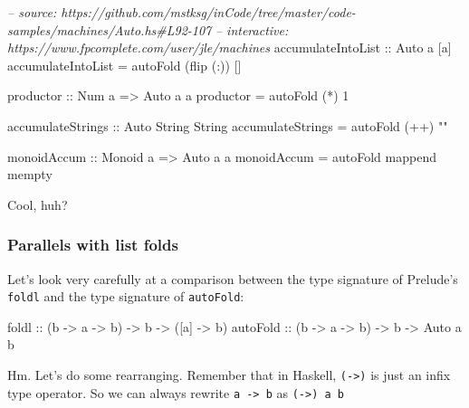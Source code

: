 \documentclass[]{article}
\newenvironment{Shaded}{\begin{snugshade}}{\end{snugshade}}
\newcommand{\CommentTok}[1]{\textcolor[rgb]{0.56,0.35,0.01}{\textit{#1}}}
\newcommand{\DataTypeTok}[1]{\textcolor[rgb]{0.13,0.29,0.53}{#1}}
\newcommand{\DecValTok}[1]{\textcolor[rgb]{0.00,0.00,0.81}{#1}}
\newcommand{\FunctionTok}[1]{\textcolor[rgb]{0.00,0.00,0.00}{#1}}
\newcommand{\NormalTok}[1]{#1}
\newcommand{\OtherTok}[1]{\textcolor[rgb]{0.56,0.35,0.01}{#1}}
\newcommand{\StringTok}[1]{\textcolor[rgb]{0.31,0.60,0.02}{#1}}
\begin{document}
\begin{Shaded}
\begin{Highlighting}[]
\CommentTok{-- source: https://github.com/mstksg/inCode/tree/master/code-samples/machines/Auto.hs#L92-107}
\CommentTok{-- interactive: https://www.fpcomplete.com/user/jle/machines}
\OtherTok{accumulateIntoList ::} \DataTypeTok{Auto}\NormalTok{ a [a]}
\NormalTok{accumulateIntoList }\FunctionTok{=}\NormalTok{ autoFold (flip (}\FunctionTok{:}\NormalTok{)) []}

\OtherTok{productor ::} \DataTypeTok{Num}\NormalTok{ a }\OtherTok{=>} \DataTypeTok{Auto}\NormalTok{ a a}
\NormalTok{productor }\FunctionTok{=}\NormalTok{ autoFold (}\FunctionTok{*}\NormalTok{) }\DecValTok{1}

\OtherTok{accumulateStrings ::} \DataTypeTok{Auto} \DataTypeTok{String} \DataTypeTok{String}
\NormalTok{accumulateStrings }\FunctionTok{=}\NormalTok{ autoFold (}\FunctionTok{++}\NormalTok{) }\StringTok{""}

\OtherTok{monoidAccum ::} \DataTypeTok{Monoid}\NormalTok{ a }\OtherTok{=>} \DataTypeTok{Auto}\NormalTok{ a a}
\NormalTok{monoidAccum }\FunctionTok{=}\NormalTok{ autoFold mappend mempty}
\end{Highlighting}
\end{Shaded}

Cool, huh?

\hypertarget{parallels-with-list-folds}{%
\subsubsection{Parallels with list folds}\label{parallels-with-list-folds}}

Let's look very carefully at a comparison between the type signature of
Prelude's \texttt{foldl} and the type signature of \texttt{autoFold}:

\begin{Shaded}
\begin{Highlighting}[]
\NormalTok{foldl}\OtherTok{      ::}\NormalTok{ (b }\OtherTok{->}\NormalTok{ a }\OtherTok{->}\NormalTok{ b) }\OtherTok{->}\NormalTok{ b }\OtherTok{->}\NormalTok{ ([a] }\OtherTok{->}\NormalTok{ b)}
\OtherTok{autoFold   ::}\NormalTok{ (b }\OtherTok{->}\NormalTok{ a }\OtherTok{->}\NormalTok{ b) }\OtherTok{->}\NormalTok{ b }\OtherTok{->}  \DataTypeTok{Auto}\NormalTok{ a b}
\end{Highlighting}
\end{Shaded}

Hm. Let's do some rearranging. Remember that in Haskell,
\texttt{(-\textgreater{})} is just an infix type operator. So we can always
rewrite \texttt{a\ -\textgreater{}\ b} as \texttt{(-\textgreater{})\ a\ b}
\end{document}
